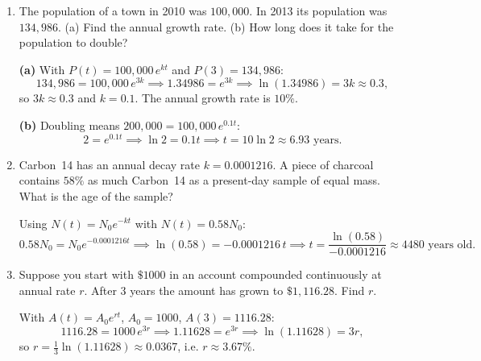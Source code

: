 \documentclass[10pt]{article}
\begin{document}
\begin{enumerate}[leftmargin=*, label=\numbox{\arabic*}, resume]

\item
    \begin{problem}[5cm]
        The population of a town in 2010 was \(100{,}000\). In 2013 its population was \(134{,}986\).
        (a) Find the annual growth rate. (b) How long does it take for the population to double?
    \end{problem}
    \begin{solution}
        \textbf{(a)} With \(P(t) = 100{,}000\, e^{kt}\) and \(P(3) = 134{,}986\):
        \[
            134{,}986 = 100{,}000\, e^{3k}
            \implies 1.34986 = e^{3k}
            \implies \ln(1.34986) = 3k \approx 0.3,
        \]
        so \(3k \approx 0.3\) and \(k = 0.1\). The annual growth rate is \(10\%\).

        \textbf{(b)} Doubling means \(200{,}000 = 100{,}000\, e^{0.1t}\):
        \[
            2 = e^{0.1t} \implies \ln 2 = 0.1t \implies t = 10\ln 2 \approx 6.93 \text{ years.}
        \]
    \end{solution}

\item
    \begin{problem}[5cm]
        Carbon~14 has an annual decay rate \(k = 0.0001216\). A piece of charcoal contains \(58\%\)
        as much Carbon~14 as a present-day sample of equal mass. What is the age of the sample?
    \end{problem}
    \begin{solution}
        Using \(N(t) = N_0 e^{-kt}\) with \(N(t) = 0.58 N_0\):
        \[
            0.58 N_0 = N_0 e^{-0.0001216 t}
            \implies \ln(0.58) = -0.0001216\, t
            \implies t = \frac{\ln(0.58)}{-0.0001216} \approx 4480 \text{ years old.}
        \]
    \end{solution}

\item
    \begin{problem}[5cm]
        Suppose you start with \(\$1000\) in an account compounded continuously at annual rate \(r\).
        After 3 years the amount has grown to \(\$1{,}116.28\). Find \(r\).
    \end{problem}
    \begin{solution}
        With \(A(t) = A_0 e^{rt}\), \(A_0 = 1000\), \(A(3) = 1116.28\):
        \[
            1116.28 = 1000\, e^{3r}
            \implies 1.11628 = e^{3r}
            \implies \ln(1.11628) = 3r,
        \]
        so \(r = \tfrac{1}{3}\ln(1.11628) \approx 0.0367\), i.e. \(r \approx 3.67\%\).
    \end{solution}


\end{enumerate}
\end{document}
